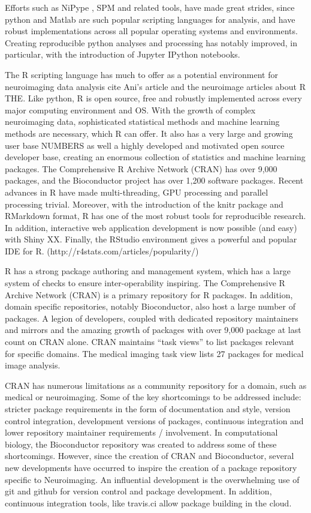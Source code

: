 \documentclass[]{elsarticle} %
\newcommand{\fixme}[1]{{\color{red} #1}}
\begin{document}
Efforts such as NiPype \citep{gorgolewski2011nipype}, SPM \citep{spm} and related tools, have made great strides, since python and Matlab are such popular scripting languages for analysis, and have robust implementations across
all popular operating systems and environments. Creating reproducible python analyses and processing has notably improved, in particular, with the introduction of Jupyter IPython notebooks.

The R scripting language \citep{r} has much to offer as a potential environment
for neuroimaging data analysis \fixme{cite Ani's article and the neuroimage articles about R THE}. Like python, R is open source, free and
robustly implemented across every major computing environment and OS.
With the growth of complex neuroimaging data, sophisticated statistical
methods and machine learning methods are necessary, which R can offer.
It also has a very large and growing user base \fixme{NUMBERS} as well a
highly developed and motivated open source developer base, creating an
enormous collection of statistics and machine learning packages. The
Comprehensive R Archive Network (CRAN) has over 9,000 packages, and the Bioconductor project \citep{bioc1,bioc2} has over 1,200 software packages. Recent advances in R have
made multi-threading, GPU processing and parallel processing trivial.
Moreover, with the introduction of the knitr package and RMarkdown
format, R has one of the most robust tools for reproducible research. In
addition, interactive web application development is now possible (and
easy) with Shiny \fixme{XX}. Finally, the RStudio environment gives a powerful and popular IDE for R. (http://r4stats.com/articles/popularity/)

R has a strong package authoring and management system, which has a
large system of checks to ensure inter-operability inspiring. The
Comprehensive R Archive Network (CRAN) is a primary repository for R
packages. In addition, domain specific repositories, notably
Bioconductor, also host a large number of packages. A legion of
developers, coupled with dedicated repository maintainers and mirrors
and the amazing growth of packages with over 9,000 package at last count
on CRAN alone. CRAN maintains ``task views'' to list packages relevant
for specific domains. The medical imaging task view lists \fixme{27} packages
for medical image analysis.

CRAN has numerous limitations as a community repository for a domain,
such as medical or neuroimaging. Some of the key shortcomings to be
addressed include: stricter package requirements in the form of
documentation and style, version control integration, development
versions of packages, continuous integration and lower repository
maintainer requirements / involvement. In computational biology, the
Bioconductor repository was created to address some of these
shortcomings. However, since the creation of CRAN and Bioconductor,
several new developments have occurred to inspire the creation of a
package repository specific to Neuroimaging. An influential development
is the overwhelming use of git and github for version control and
package development. In addition, continuous integration tools, like
travis.ci allow package building in the cloud.
\end{document}
